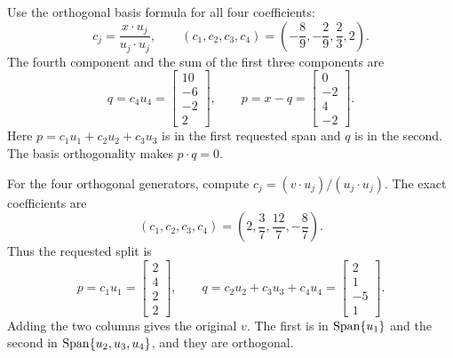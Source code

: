 Use the orthogonal basis formula for all four coefficients:
\[c_j=\frac{x\cdot u_j}{u_j\cdot u_j},\qquad(c_1,c_2,c_3,c_4)=(- \frac{8}{9},- \frac{2}{9},\frac{2}{3},2).\]
The fourth component and the sum of the first three components are
\[q=c_4u_4=\left[\begin{array}{r}10\\-6\\-2\\2\end{array}\right],\qquad p=x-q=\left[\begin{array}{r}0\\-2\\4\\-2\end{array}\right].\]
Here $p=c_1u_1+c_2u_2+c_3u_3$ is in the first requested span and $q$ is in the second. The basis orthogonality makes $p\cdot q=0$.

For the four orthogonal generators, compute $c_j=(v\cdot u_j)/(u_j\cdot u_j)$. The exact coefficients are
\[(c_1,c_2,c_3,c_4)=(2,\frac{3}{7},\frac{12}{7},- \frac{8}{7}).\]
Thus the requested split is
\[p=c_1u_1=\left[\begin{array}{r}2\\4\\2\\2\end{array}\right],\qquad q=c_2u_2+c_3u_3+c_4u_4=\left[\begin{array}{r}2\\1\\-5\\1\end{array}\right].\]
Adding the two columns gives the original $v$. The first is in $\operatorname{Span}\{u_1\}$ and the second in $\operatorname{Span}\{u_2,u_3,u_4\}$, and they are orthogonal.

